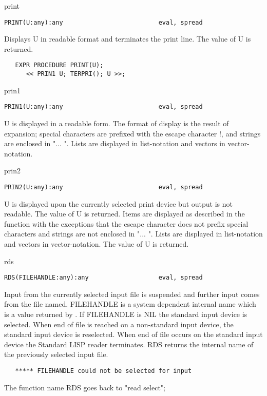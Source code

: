 \begin{Function}{print}
\begin{verbatim}
PRINT(U:any):any                          eval, spread
\end{verbatim}
   Displays  U in   readable format and  terminates the print
   line.  The value of U is returned.
\begin{verbatim}
   EXPR PROCEDURE PRINT(U);
      << PRIN1 U; TERPRI(); U >>;
\end{verbatim}
\end{Function}
\begin{Function}{prin1}
\begin{verbatim}
PRIN1(U:any):any                          eval, spread
\end{verbatim}
   U  is  displayed  in  a   readable  form.     The  format
   of  display  is  the  result  of    expansion;  special
   characters  are  prefixed  with the  escape  character !,  and
   strings  are  enclosed  in "... ".    Lists  are  displayed in
   list-notation and vectors in vector-notation.

\end{Function}
\begin{Function}{prin2}
\begin{verbatim}
PRIN2(U:any):any                          eval, spread
\end{verbatim}
   U  is  displayed  upon  the  currently  selected  print device
   but  output  is  not   readable.     The  value  of U  is
   returned.    Items are displayed  as described  in the 
   function  with the  exceptions that the  escape character does
   not  prefix special characters and strings are not enclosed in
   "... ".   Lists are displayed in  list-notation and vectors in
   vector-notation.  The value of U is returned.

\end{Function}
\begin{Function}{rds}
\begin{verbatim}
RDS(FILEHANDLE:any):any                   eval, spread
\end{verbatim}
   Input  from  the currently  selected  input file  is suspended
   and  further input comes  from the file named.   FILEHANDLE is
   a  system dependent  internal name  which is  a value returned
   by  . If  FILEHANDLE is NIL  the standard  input device is
   selected.    When  end of  file is  reached on  a non-standard
   input  device, the standard input device  is reselected.  When
   end  of file occurs on the  standard input device the Standard
   LISP  reader terminates.  RDS returns the internal name of the
   previously selected input file.
\begin{verbatim}
   ***** FILEHANDLE could not be selected for input
\end{verbatim}
The function name RDS goes back to  "read select";
\end{Function}
